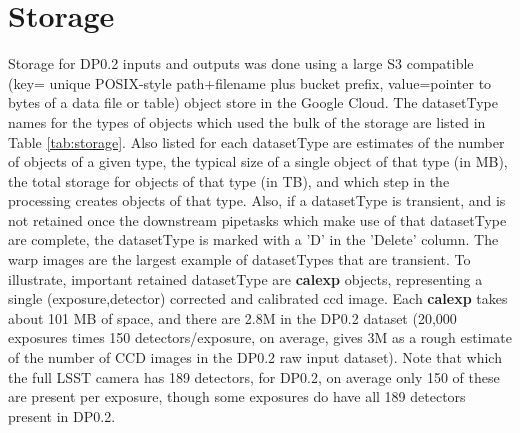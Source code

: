 \documentclass[OPS,authoryear,toc]{lsstdoc}
\begin{document}
\section{Storage}

Storage for DP0.2 inputs and outputs was done using a large S3 compatible
(key= unique POSIX-style path+filename plus bucket prefix, value=pointer
to bytes of a data file or table) object store in the Google Cloud.   
The datasetType names for the types of objects which used the bulk 
of the storage are listed in Table \ref{tab:storage}.  Also listed
for each datasetType are estimates of the number of objects of a given type,
the typical size of a single object of that type (in MB), the total
storage for objects of that type (in TB), and which step in the processing
creates objects of that type.  Also, if a datasetType is transient, and 
is not retained once the downstream pipetasks which make use of that
datasetType are complete, the datasetType is marked with a 'D' in the 'Delete'
column.  The warp images are the largest example of datasetTypes that are
transient.
To illustrate, important retained datasetType are {\bf calexp} objects, 
representing a single (exposure,detector) corrected and 
calibrated ccd image.
Each {\bf calexp} takes about 101 MB of space, and there are 2.8M 
in the DP0.2 dataset (20,000 exposures times 150 detectors/exposure, on average, gives 3M as a rough estimate of the number of CCD images in the DP0.2 raw
input dataset).  Note that which the full LSST camera has 189 
detectors, for DP0.2, on average only 150 of these are present per exposure,
though some exposures do have all 189 detectors present in DP0.2.
\end{document}
